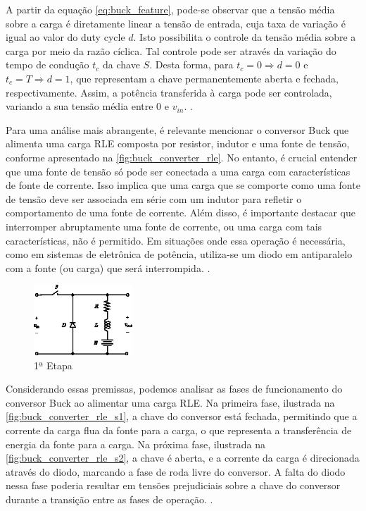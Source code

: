 A partir da equação \eqref{eq:buck_feature}, pode-se observar que a tensão média sobre a carga é diretamente linear a tensão de entrada, cuja taxa de variação é igual ao valor do duty cycle $d$. Isto possibilita o controle da tensão média sobre a carga por meio da razão cíclica. Tal controle pode ser através da variação do tempo de condução $t_c$ da chave $S$. Desta forma, para $t_c = 0 \Rightarrow d = 0$ e $t_c = T \Rightarrow d = 1$, que representam a chave permanentemente aberta e fechada, respectivamente. Assim, a potência transferida à carga pode ser controlada, variando a sua tensão média entre 0 e $v_{in}$. \cite{martins2008}.

Para uma análise mais abrangente, é relevante mencionar o conversor Buck que alimenta uma carga RLE composta por resistor, indutor e uma fonte de tensão, conforme apresentado na \autoref{fig:buck_converter_rle}. No entanto, é crucial entender que uma fonte de tensão só pode ser conectada a uma carga com características de fonte de corrente. Isso implica que uma carga que se comporte como uma fonte de tensão deve ser associada em série com um indutor para refletir o comportamento de uma fonte de corrente. Além disso, é importante destacar que interromper abruptamente uma fonte de corrente, ou uma carga com tais características, não é permitido. Em situações onde essa operação é necessária, como em sistemas de eletrônica de potência, utiliza-se um diodo em antiparalelo com a fonte (ou carga) que será interrompida. \cite{martins2008}.

\begin{figure}[H]
  \centering
  \includegraphics[width=0.33\textwidth]{figuras/buck_converter_rle.eps}
  \caption{1ª Etapa}
  \label{fig:buck_converter_rle}
\end{figure}

Considerando essas premissas, podemos analisar as fases de funcionamento do conversor Buck ao alimentar uma carga RLE. Na primeira fase, ilustrada na \autoref{fig:buck_converter_rle_s1}, a chave do conversor está fechada, permitindo que a corrente da carga flua da fonte para a carga, o que representa a transferência de energia da fonte para a carga. Na próxima fase, ilustrada na \autoref{fig:buck_converter_rle_s2}, a chave é aberta, e a corrente da carga é direcionada através do diodo, marcando a fase de roda livre do conversor. A falta do diodo nessa fase poderia resultar em tensões prejudiciais sobre a chave do conversor durante a transição entre as fases de operação. \cite{martins2008}.


